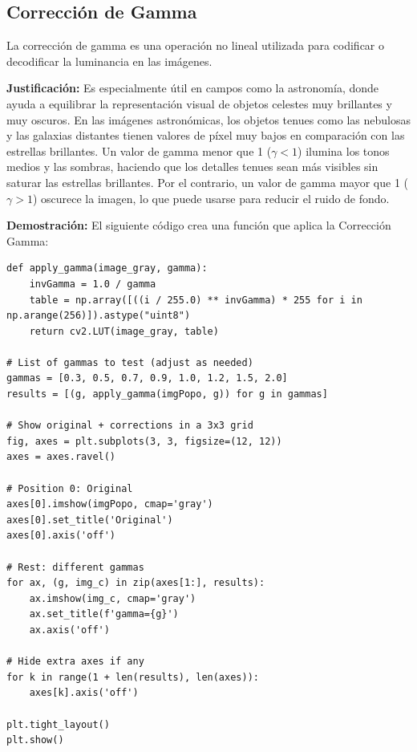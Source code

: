 \documentclass[12pt,letterpaper]{article}
\begin{document}
\subsection{Corrección de Gamma}

La corrección de gamma es una operación no lineal utilizada para codificar o decodificar la luminancia en las imágenes. 

\textbf{Justificación:} Es especialmente útil en campos como la astronomía, donde ayuda a equilibrar la representación visual de objetos celestes muy brillantes y muy oscuros.
En las imágenes astronómicas, los objetos tenues como las nebulosas y las galaxias distantes tienen valores de píxel muy bajos en comparación con las estrellas brillantes. Un valor de gamma menor que 1 ($\gamma < 1$) ilumina los tonos medios y las sombras, haciendo que los detalles tenues sean más visibles sin saturar las estrellas brillantes. Por el contrario, un valor de gamma mayor que 1 ($\gamma > 1$) oscurece la imagen, lo que puede usarse para reducir el ruido de fondo.

\textbf{Demostración:} El siguiente código crea una función que aplica la Corrección Gamma:

\begin{verbatim}
def apply_gamma(image_gray, gamma):
    invGamma = 1.0 / gamma
    table = np.array([((i / 255.0) ** invGamma) * 255 for i in np.arange(256)]).astype("uint8")
    return cv2.LUT(image_gray, table)

# List of gammas to test (adjust as needed)
gammas = [0.3, 0.5, 0.7, 0.9, 1.0, 1.2, 1.5, 2.0]
results = [(g, apply_gamma(imgPopo, g)) for g in gammas]

# Show original + corrections in a 3x3 grid
fig, axes = plt.subplots(3, 3, figsize=(12, 12))
axes = axes.ravel()

# Position 0: Original
axes[0].imshow(imgPopo, cmap='gray')
axes[0].set_title('Original')
axes[0].axis('off')

# Rest: different gammas
for ax, (g, img_c) in zip(axes[1:], results):
    ax.imshow(img_c, cmap='gray')
    ax.set_title(f'gamma={g}')
    ax.axis('off')

# Hide extra axes if any
for k in range(1 + len(results), len(axes)):
    axes[k].axis('off')

plt.tight_layout()
plt.show()
\end{verbatim}
\end{document}
